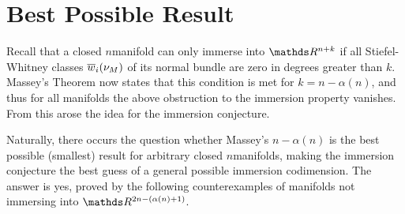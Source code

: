 \section{Best Possible Result}\label{sec:bestpossibleresult}
Recall that a closed $n$\nbd{}manifold can only immerse into
$\R^{n+k}$ if all Stiefel-Whitney classes ${\overline{w}_{i}}(\nu_{M})$ of its
normal bundle are zero in degrees greater than $k$.
Massey's Theorem now states that this condition is met for
$k=n-\alpha(n)$, and thus for all manifolds the above
obstruction to the immersion property vanishes. From this arose the
idea for the immersion conjecture.

Naturally, there occurs the question whether Massey's $n-\alpha(n)$ is
the best possible (\idest smallest) result for arbitrary closed
$n$\nbd{}manifolds, making the immersion conjecture the best
guess of a general possible immersion codimension.
The answer is yes, proved by the following counterexamples of manifolds
not immersing into $\R^{2n-(\alpha(n)+1)}$.

